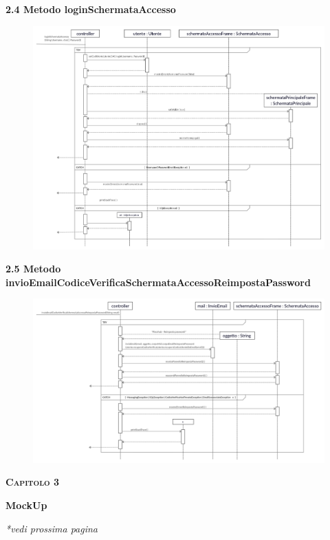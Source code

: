 \documentclass[a4paper,12pt]{article}
\begin{document}
\newpage\null{}\setcounter{page}{8}
\begin{flushleft}
\vspace*{+1cm}
{\bf\normalsize 2.4 Metodo loginSchermataAccesso }
\begin{center}
	\begin{figure}[h]
	\centering
 	\includegraphics[width=1\textwidth]{loginSchermataAccesso.jpg}
	\end{figure}
\end{center}
\end{flushleft}
\newpage

\newpage\null{}\setcounter{page}{9}
\begin{flushleft}
\vspace*{+2cm}
{\bf\normalsize 2.5 Metodo invioEmailCodiceVerificaSchermataAccessoReimpostaPassword }
\begin{center}
	\begin{figure}[h]
	\centering
 	\includegraphics[width=1\textwidth]{invioEmailCodiceVerificaSchermataAccessoReimpostaPassword.jpg}
	\end{figure}
\end{center}
\end{flushleft}
\newpage

\newpage\null{}\setcounter{page}{10}
\vspace*{+1cm}
\Large\textsc{\bf Capitolo 3}
\vspace*{+1cm}

\begingroup
\fontsize{35pt}{12pt}\selectfont\bf{MockUp}
\endgroup
\vspace*{+2cm}
\begin{center}
\normalsize{\it{*vedi prossima pagina}}
\end{center}

\newpage
\end{document}
